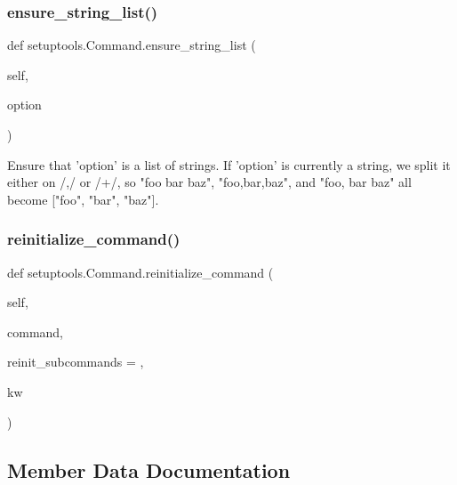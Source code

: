 \subsubsection{\texorpdfstring{ensure\+\_\+string\+\_\+list()}{ensure\_string\_list()}}
{\footnotesize\ttfamily def setuptools.\+Command.\+ensure\+\_\+string\+\_\+list (\begin{DoxyParamCaption}\item[{}]{self,  }\item[{}]{option }\end{DoxyParamCaption})}

\begin{DoxyVerb}Ensure that 'option' is a list of strings.  If 'option' is
currently a string, we split it either on /,\s*/ or /\s+/, so
"foo bar baz", "foo,bar,baz", and "foo,   bar baz" all become
["foo", "bar", "baz"].
\end{DoxyVerb}
 \mbox{\label{classsetuptools_1_1Command_a0f2625d346bd4fd112eb84c199cb3951}} 
\subsubsection{\texorpdfstring{reinitialize\+\_\+command()}{reinitialize\_command()}}
{\footnotesize\ttfamily def setuptools.\+Command.\+reinitialize\+\_\+command (\begin{DoxyParamCaption}\item[{}]{self,  }\item[{}]{command,  }\item[{}]{reinit\+\_\+subcommands = {},  }\item[{}]{kw }\end{DoxyParamCaption})}



\subsection{Member Data Documentation}
\mbox{\label{classsetuptools_1_1Command_a3be918b6c67e9e1b1a9679781044adbc}} 
